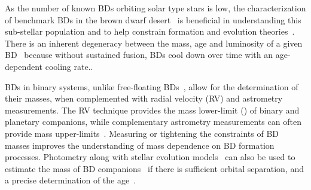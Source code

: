 As the number of known BDs orbiting solar type stars is low, the characterization of benchmark BDs in the brown dwarf desert~\citep[e.g.][]{crepp_trends_2016} is beneficial in understanding this sub-stellar population and to help constrain formation and evolution theories~\citep{whitworth_formation_2007}.
There is an inherent degeneracy between the mass, age and luminosity of a given BD~\citep{burrows_nongray_1997} because without sustained fusion, BDs cool down over time with an age-dependent cooling rate..

BDs in binary systems, unlike free-floating BDs~\citep[e.g][]{gagne_simp_2017}, allow for the determination of their masses, when complemented with radial velocity ({RV}) and astrometry measurements.
The {RV} technique provides the mass lower-limit (\Mtwosini{}) of binary and planetary companions, while complementary astrometry measurements can often provide mass upper-limits~\citep[e.g.][]{sahlmann_search_2011}.
Measuring or tightening the constraints of BD masses improves the understanding of mass dependence on BD formation processes.
Photometry along with stellar evolution models~\citep[e.g.][]{baraffe_evolutionary_2003,allard_btsettl_2013} can also be used to estimate the mass of BD companions~\citep[e.g.][]{moutou_eccentricity_2017} if there is sufficient orbital separation, and a precise determination of the age~\citep{soderblom_ages_2010}.


%
%
%
%
%
%
